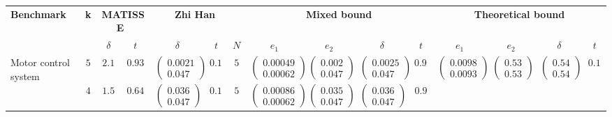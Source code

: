 \begin{table*}[t] 
\centering 
\scriptsize
\tabcolsep=0.11cm 
\begin{tabular}{|p{1.5cm}|c|c|c|c|c|c|c|c|c|c|c|c|c|c|} 
\hline 
\multirow{2}{*}{\textbf{Benchmark}} &\multirow{2}{*}{\textbf{k}} & \multicolumn{2}{c|}{\textbf{MATISSE~\cite{girard2007approximate}}} & \multicolumn{3}{c|}{\textbf{Zhi Han~\cite{han2004reachability}}} & \multicolumn{4}{c|}{\textbf{Mixed bound}} & \multicolumn{4}{c|}{\textbf{Theoretical bound}} \\ 
\cline{3-15} 
&  & {$\delta$} & $t$ & $\delta$ & $t$ & $N$ & $ e_1 $ & $ e_2 $ & $\delta$ &$t$ & $e_1 $ & $e_2$ & $\delta$ &$t$ \\ 
\hline 
\multirow{2}{*}{\parbox{1.5cm}{Motor control system}} 
& $5$ 
& $2.1$ & $0.93$ 
&$\begin{pmatrix}0.0021  \\ 0.047\end{pmatrix}$ & $0.17 $ & {$5$} 
&$\begin{pmatrix}0.00049  \\ 0.00062 \end{pmatrix}$ &$\begin{pmatrix}0.002  \\ 0.047 \end{pmatrix}$ &$\begin{pmatrix}0.0025  \\ 0.047 \end{pmatrix}$ & $0.92$ 
&$\begin{pmatrix}0.0098  \\ 0.0093 \end{pmatrix}$ &$\begin{pmatrix}0.53  \\ 0.53 \end{pmatrix}$ &$\begin{pmatrix}0.54  \\ 0.54 \end{pmatrix}$ & $0.15$  \\ 
\cline{2-15} 
& $4$ 
& $1.5$ & $0.64$ 
&$\begin{pmatrix}0.036  \\ 0.047\end{pmatrix}$ & $0.19 $ & {$5$} 
&$\begin{pmatrix}0.00086  \\ 0.00062 \end{pmatrix}$ &$\begin{pmatrix}0.035  \\ 0.047 \end{pmatrix}$ &$\begin{pmatrix}0.036  \\ 0.047 \end{pmatrix}$ & $0.9$ 

\end{tabular}
\end{table*}
